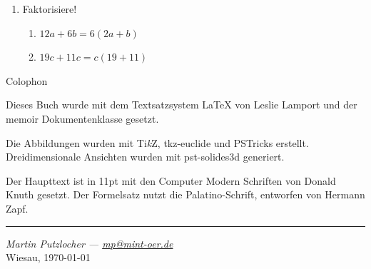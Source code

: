 \documentclass[
a6paper, %
11pt, %
onecolumn, %
openany, %
]{memoir}
\theoremstyle{break}
\theoremstyle{break}
\theoremstyle{changebreak}
\theoremstyle{nonumberbreak}
\theoremstyle{nonumberplain}
\begin{document}
\begin{enumerate}
 \item Faktorisiere!
 \begin{enumerate}
  \item \(12a+6b = 6(2a+b)\)
  \item \(19c+11c = c(19+11)\)
 \end{enumerate}

\end{enumerate}

\clearpage 
\listoffigures

\clearpage
\def\tikzname{Ti\emph{k}Z} 
\pagestyle{empty}
\null\vfill

\begin{adjustwidth}{0.4in}{0.4in}
\begin{center}
{\Large\textsf{Colophon}}
\end{center}
\small
 \begin{center}
Dieses Buch wurde mit dem Textsatzsystem \LaTeX{} von Leslie Lamport und der
memoir Dokumentenklasse gesetzt.

Die Abbildungen wurden mit \tikzname{}, \textsf{tkz-euclide} und PSTricks erstellt. Dreidimensionale Ansichten wurden mit \textsf{pst-solides3d} generiert.

Der Haupttext ist in 11pt mit den Computer Modern Schriften von Donald Knuth gesetzt.
Der Formelsatz nutzt die Palatino-Schrift, entworfen von Hermann Zapf.
\end{center} 

\end{adjustwidth}
\vfill
\hrule
\vfil
\begin{center}
\textit{Martin Putzlocher --- \url{mp@mint-oer.de}}\\
Wiesau, \today
\end{center}


% 
% 
\end{document}

